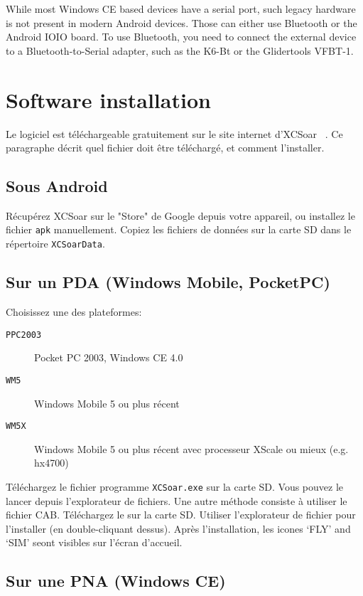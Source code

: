 While most Windows CE based devices have a serial port, such legacy
hardware is not present in modern Android devices.  Those can either
use Bluetooth or the Android IOIO board.  To use Bluetooth, you need
to connect the external device to a Bluetooth-to-Serial adapter, such
as the K6-Bt or the Glidertools VFBT-1.


\section{Software installation}

Le logiciel est téléchargeable gratuitement sur le site internet d'XCSoar ~\xcsoarwebsite{}.  Ce paragraphe décrit quel fichier doit être téléchargé, et comment l'installer.

\subsection*{Sous Android}

Récupérez XCSoar sur le "Store" de Google depuis votre appareil, ou installez le fichier \verb|apk|
manuellement.  Copiez les fichiers de données sur la carte SD dans le répertoire \verb|XCSoarData|.

\subsection*{Sur un  PDA (Windows Mobile, PocketPC)}

Choisissez une des plateformes:

\begin{description}
\item[\texttt{PPC2003}] Pocket PC 2003, Windows CE 4.0
\item[\texttt{WM5}] Windows Mobile 5 ou plus récent
\item[\texttt{WM5X}] Windows Mobile 5 ou plus récent avec processeur XScale ou mieux
(e.g. hx4700)
\end{description}

Téléchargez le fichier programme \verb|XCSoar.exe| sur la carte SD. Vous pouvez le lancer depuis l'explorateur de fichiers.
Une autre méthode consiste à utiliser le fichier CAB. Téléchargez le sur la carte SD. Utiliser l'explorateur de fichier pour l'installer (en double-cliquant dessus). Après l'installation, les icones `FLY' and `SIM' seont visibles sur l'écran d'accueil.


\subsection*{Sur une PNA (Windows CE)}

